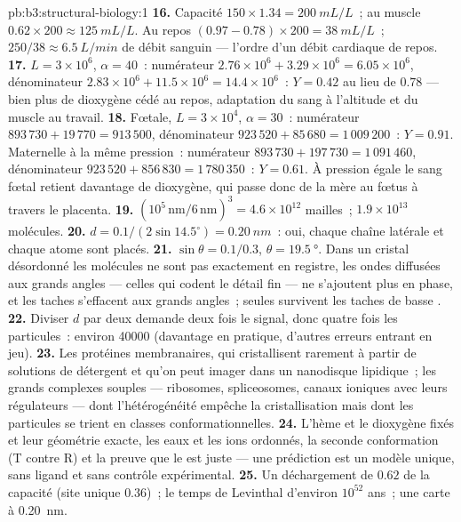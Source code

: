 \begin{solution}{pb:b3:structural-biology:1}
\textbf{16.} Capacité $150\times 1.34 = \qty{200}{mL/L}$~; au muscle
$0.62\times 200 \approx \qty{125}{mL/L}$. Au repos $(0.97 - 0.78)\times
200 = \qty{38}{mL/L}$~; $250/38 \approx \qty{6.5}{L/min}$ de débit
sanguin --- l'ordre d'un débit cardiaque de repos.
\textbf{17.} $L = 3\times 10^{6}$, $\alpha = 40$~: numérateur $2.76\times
10^{6} + 3.29\times 10^{6} = 6.05\times 10^{6}$, dénominateur $2.83\times
10^{6} + 11.5\times 10^{6} = 14.4\times 10^{6}$~: $Y = 0.42$ au lieu de
$0.78$ --- bien plus de dioxygène cédé au repos, adaptation du sang à
l'altitude et du muscle au travail.
\textbf{18.} Fœtale, $L = 3\times 10^{4}$, $\alpha = 30$~: numérateur
$893\,730 + 19\,770 = 913\,500$, dénominateur $923\,520 + 85\,680 =
1\,009\,200$~: $Y = 0.91$. Maternelle à la même pression~: numérateur
$893\,730 + 197\,730 = 1\,091\,460$, dénominateur $923\,520 + 856\,830
= 1\,780\,350$~: $Y = 0.61$. À pression égale le sang fœtal retient
davantage de dioxygène, qui passe donc de la mère au fœtus à travers le
placenta.
\textbf{19.} $(10^{5}\,\text{nm}/6\,\text{nm})^{3} = 4.6\times 10^{12}$
mailles~; $1.9\times 10^{13}$ molécules.
\textbf{20.} $d = 0.1/(2\sin 14.5^{\circ}) = \qty{0.20}{nm}$~: oui,
chaque chaîne latérale et chaque atome sont placés.
\textbf{21.} $\sin\theta = 0.1/0.3$, $\theta = \qty{19.5}{\degree}$.
Dans un cristal désordonné les molécules ne sont pas exactement en
registre, les ondes diffusées aux grands angles --- celles qui codent
le détail fin --- ne s'ajoutent plus en phase, et les taches
s'effacent aux grands angles~; seules survivent les taches de basse
.
\textbf{22.} Diviser $d$ par deux demande deux fois le signal, donc
quatre fois les particules~: environ \num{40000} (davantage en
pratique, d'autres erreurs entrant en jeu).
\textbf{23.} Les protéines membranaires, qui cristallisent rarement à
partir de solutions de détergent et qu'on peut imager dans un
nanodisque lipidique~; les grands complexes souples --- ribosomes,
spliceosomes, canaux ioniques avec leurs régulateurs --- dont
l'hétérogénéité empêche la cristallisation mais dont les particules se
trient en classes conformationnelles.
\textbf{24.} L'hème et le dioxygène fixés et leur géométrie exacte, les
eaux et les ions ordonnés, la seconde conformation (T contre R) et la
preuve que le  est juste --- une prédiction est un modèle
unique, sans ligand et sans contrôle expérimental.
\textbf{25.} Un déchargement de $0.62$ de la capacité (site unique
$0.36$)~; le temps de Levinthal d'environ $10^{52}$ ans~; une carte à
\qty{0.20}{nm}.
\end{solution}
